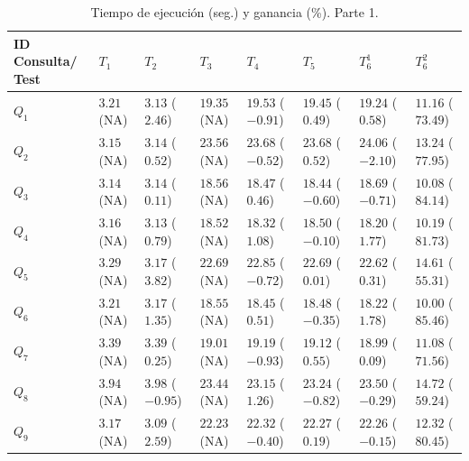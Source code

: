 \documentclass[a4paper,final,11pt,fleqn,twoside]{book}  %
\begin{document}
\begin{table}[!h]
\renewcommand{\arraystretch}{1.3}
\begin{center}
\begin{tabular}{|p{1.5cm}|p{1.5cm}|p{1.5cm}|p{1.5cm}|p{1.5cm}|p{1.5cm}|p{1.5cm}|p{1.5cm}|}
\hline
\textbf{ID Consulta/ Test} & $T_1$ & $T_2$ & $T_3$ & $T_4$ & $T_5$ & $T^{1}_{6}$ & $T^{2}_{6}$ \\ \hline
  $Q_1$ & $3.21$ (NA) & $3.13$ ($2.46$) & $19.35$ (NA) & $19.53$ ($-0.91$) & $19.45$ ($0.49$)  & $19.24$ ($0.58$) & $11.16$ ($73.49$)\\ \hline
  $Q_2$ & $3.15$ (NA) & $3.14$ ($0.52$) & $23.56$ (NA)   & $23.68$ ($-0.52$)  & $23.68$ ($0.52$) & $24.06$ ($-2.10$) & $13.24$ ($77.95$) \\ \hline
  $Q_3$ & $3.14$ (NA)  & $3.14$ ($0.11$) & $18.56$ (NA)  & $18.47$ ($0.46$)  & $18.44$ ($-0.60$)  & $18.69$ ($-0.71$)  & $10.08$ ($84.14$) \\ \hline
  $Q_4$ & $3.16$ (NA)  & $3.13$ ($0.79$) & $18.52$ (NA)  & $18.32$ ($1.08$)  & $18.50$ ($-0.10$)  & $18.20$ ($1.77$)  & $10.19$ ($81.73$) \\ \hline
  $Q_5$ & $3.29$ (NA)  & $3.17$ ($3.82$) & $22.69$ (NA)  & $22.85$ ($-0.72$)  & $22.69$ ($0.01$)  & $22.62$ ($0.31$)  & $14.61$ ($55.31$) \\ \hline
  $Q_6$ & $3.21$ (NA)  & $3.17$ ($1.35$) & $18.55$ (NA)  & $18.45$ ($0.51$)  & $18.48$ ($-0.35$)  & $18.22$ ($1.78$)  & $10.00$ ($85.46$) \\ \hline
  $Q_7$ & $3.39$ (NA)  & $3.39$ ($0.25$) & $19.01$ (NA)  & $19.19$ ($-0.93$)  & $19.12$ ($0.55$)  & $18.99$ ($0.09$)  & $11.08$ ($71.56$) \\ \hline
  $Q_8$ & $3.94$ (NA)  & $3.98$ ($-0.95$)& $23.44$ (NA)  & $23.15$ ($1.26$)  & $23.24$ ($-0.82$)  & $23.50$ ($-0.29$)  & $14.72$ ($59.24$) \\ \hline
  $Q_9$ & $3.17$ (NA)  & $3.09$ ($2.59$) & $22.23$ (NA)  & $22.32$ ($-0.40$)  & $22.27$ ($0.19$)  & $22.26$ ($-0.15$)  & $12.32$ ($80.45$) \\ \hline
  \hline
  \end{tabular}
  \caption{Tiempo de ejecución (seg.) y ganancia (\%). Parte 1.}
  \label{tabla:results-1}
  \end{center}
\end{table} 
\end{document}
